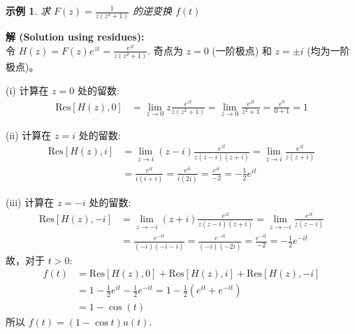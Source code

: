 \documentclass[linespread=1.5,openany]{book}%
\theoremstyle{plain}
\newtheorem{example}[theorem]{示例}
\begin{document}
{{{{{{{									\begin{example}求 $F(z) = \frac{1}{z(z^2+1)}$ 的逆变换 $f(t)$ \label{ex:L16_inv_laplace_ex9_corrected_spaced}
									\end{example}
									\noindent\textbf{解 (Solution using residues):} \\
									令 $H(z) = F(z)e^{zt} = \frac{e^{zt}}{z(z^2+1)}$.
									奇点为 $z=0$ (一阶极点) 和 $z=\pm i$ (均为一阶极点)。
									
									(i) 计算在 $z=0$ 处的留数:
									\begin{align*}
										\text{Res}[H(z), 0] &= \lim_{z\to 0} z \frac{e^{zt}}{z(z^2+1)} = \lim_{z\to 0} \frac{e^{zt}}{z^2+1} = \frac{e^0}{0+1} = 1
									\end{align*}
									
									(ii) 计算在 $z=i$ 处的留数:
									\begin{align*}
										\text{Res}[H(z), i] &= \lim_{z\to i} (z-i) \frac{e^{zt}}{z(z-i)(z+i)} = \lim_{z\to i} \frac{e^{zt}}{z(z+i)} \\[6pt]
										&= \frac{e^{it}}{i(i+i)} = \frac{e^{it}}{i(2i)} = \frac{e^{it}}{-2} = -\frac{1}{2}e^{it}
									\end{align*}
									
									(iii) 计算在 $z=-i$ 处的留数:
									\begin{align*}
										\text{Res}[H(z), -i] &= \lim_{z\to -i} (z+i) \frac{e^{zt}}{z(z-i)(z+i)} = \lim_{z\to -i} \frac{e^{zt}}{z(z-i)} \\[6pt]
										&= \frac{e^{-it}}{(-i)(-i-i)} = \frac{e^{-it}}{(-i)(-2i)} = \frac{e^{-it}}{-2} = -\frac{1}{2}e^{-it}
									\end{align*}
									故，对于 $t>0$:
									\begin{align*}
										f(t) &= \text{Res}[H(z), 0] + \text{Res}[H(z), i] + \text{Res}[H(z), -i] \\[6pt]
										&= 1 - \frac{1}{2}e^{it} - \frac{1}{2}e^{-it} = 1 - \frac{1}{2}(e^{it} + e^{-it}) \\[6pt]
										&= 1 - \cos(t)
									\end{align*}
									所以 $f(t) = (1-\cos t)u(t)$.
									\vspace{\baselineskip}
									
}}}}}}}
\end{document}
